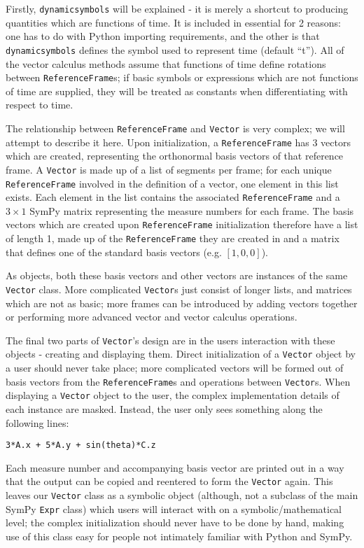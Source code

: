 \documentclass[twocolumn,10pt]{asme2e}
\begin{document}
Firstly, \verb|dynamicsymbols| will be explained - it is merely a shortcut to
producing quantities which are functions of time.
It is included in essential for 2 reasons: one has to do with Python importing
requirements, and the other is that \verb|dynamicsymbols| defines the symbol
used to represent time (default ``t'').
All of the vector calculus methods assume that functions of time define
rotations between \verb|ReferenceFrame|s; if basic symbols or expressions which
are not functions of time are supplied, they will be treated as constants when
differentiating with respect to time.

The relationship between \verb|ReferenceFrame| and \verb|Vector| is very
complex; we will attempt to describe it here.
Upon initialization, a \verb|ReferenceFrame| has 3 vectors which are created,
representing the orthonormal basis vectors of that reference frame.
A \verb|Vector| is made up of a list of segments per frame; for each unique
\verb|ReferenceFrame| involved in the definition of a vector, one element in
this list exists.
Each element in the list contains the associated \verb|ReferenceFrame| and a
$3\times1$ SymPy matrix representing the measure numbers for each frame.
The basis vectors which are created upon \verb|ReferenceFrame| initialization
therefore have a list of length 1, made up of the \verb|ReferenceFrame| they
are created in and a matrix that defines one of the standard basis vectors
(e.g. $[1, 0, 0]$).

As objects, both these basis vectors and other vectors are instances of the
same \verb|Vector| class.
More complicated \verb|Vector|s just consist of longer lists, and matrices
which are not as basic; more frames can be introduced by adding vectors
together or performing more advanced vector and vector calculus operations.

The final two parts of \verb|Vector|'s design are in the users interaction with
these objects - creating and displaying them.
Direct initialization of a \verb|Vector| object by a user should never take
place; more complicated vectors will be formed out of basis vectors from the
\verb|ReferenceFrame|s and operations between \verb|Vector|s.
When displaying a \verb|Vector| object to the user, the complex implementation
details of each instance are masked.
Instead, the user only sees something along the following lines:
\begin{verbatim}
3*A.x + 5*A.y + sin(theta)*C.z
\end{verbatim}
Each measure number and accompanying basis vector are printed out in a way that
the output can be copied and reentered to form the \verb|Vector| again.
This leaves our \verb|Vector| class as a symbolic object (although, not a
subclass of the main SymPy \verb|Expr| class) which users will interact with on
a symbolic/mathematical level; the complex initialization should never have to
be done by hand, making use of this class easy for people not intimately
familiar with Python and SymPy.
\end{document}
